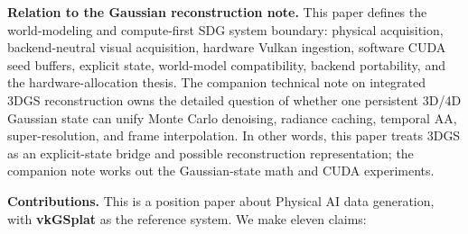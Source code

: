 \documentclass[10pt,journal,onecolumn]{IEEEtran}
\begin{document}
\textbf{Relation to the Gaussian reconstruction note.} This paper defines the
world-modeling and compute-first SDG system boundary: physical acquisition,
backend-neutral visual acquisition, hardware Vulkan ingestion, software CUDA seed
buffers, explicit state, world-model compatibility, backend portability, and the
hardware-allocation thesis. The companion technical
note on integrated 3DGS reconstruction owns the detailed question of whether one
persistent 3D/4D Gaussian state can unify Monte Carlo denoising, radiance
caching, temporal AA, super-resolution, and frame interpolation. In other words,
this paper treats 3DGS as an explicit-state bridge and possible reconstruction
representation; the companion note works out the Gaussian-state math and CUDA
experiments.

\textbf{Contributions.} This is a position paper about Physical AI data
generation, with \textbf{vkGSplat} as the reference system. We make eleven claims:
\end{document}
